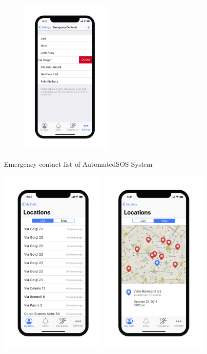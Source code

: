 \begin{figure}[H]
    \centering
    \includegraphics[width=0.4\textwidth]{rasdL/Pictures/Mockup/mobile/emergency_contacts.png}

\end{figure}
\hspace{3.8cm}Emergency contact list of AutomatedSOS System

\includegraphics[width=0.4\textwidth]{rasdL/Pictures/Mockup/mobile/location1.png}%
\includegraphics[width=0.4\textwidth]{rasdL/Pictures/Mockup/mobile/location2.png}


